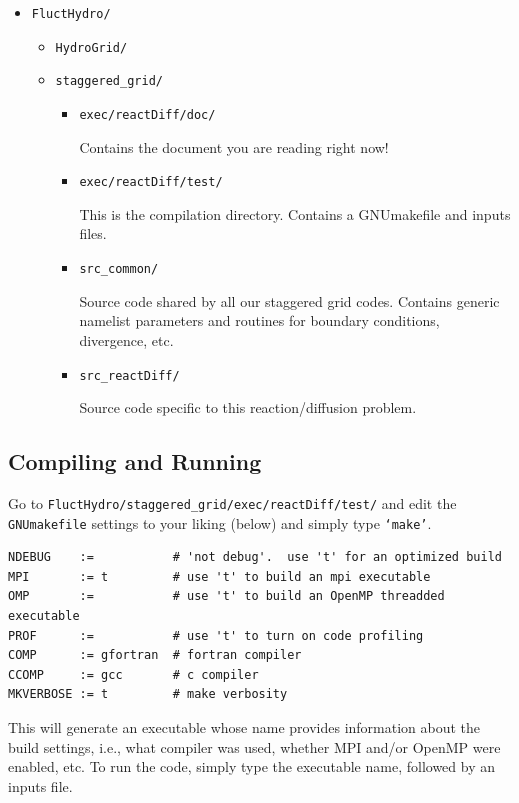 \documentclass[final]{siamltex}
\begin{document}
\begin{itemize}

\item {\tt FluctHydro/}

\begin{itemize}

\item {\tt HydroGrid/}

\item {\tt staggered\_grid/}

\begin{itemize}

\item {\tt exec/reactDiff/doc/}

Contains the document you are reading right now!

\item {\tt exec/reactDiff/test/}

This is the compilation directory.  Contains a GNUmakefile and inputs files.

\item {\tt src\_common/}

Source code shared by all our staggered grid codes.  Contains generic namelist parameters
and routines for boundary conditions, divergence, etc.

\item {\tt src\_reactDiff/}

Source code specific to this reaction/diffusion problem.

\end{itemize}
\end{itemize}
\end{itemize}

\subsection{Compiling and Running}
Go to {\tt FluctHydro/staggered\_grid/exec/reactDiff/test/} and edit the 
{\tt GNUmakefile} settings to your liking (below) and simply type {\tt `make'}.\\
\begin{verbatim}
NDEBUG    :=           # 'not debug'.  use 't' for an optimized build
MPI       := t         # use 't' to build an mpi executable
OMP       :=           # use 't' to build an OpenMP threadded executable
PROF      :=           # use 't' to turn on code profiling
COMP      := gfortran  # fortran compiler
CCOMP     := gcc       # c compiler
MKVERBOSE := t         # make verbosity

\end{verbatim}
This will generate an executable whose name provides information about the build settings,
i.e., what compiler was used, whether MPI and/or OpenMP were enabled, etc.
To run the code, simply type the executable name, followed by an inputs file.
\end{document}
